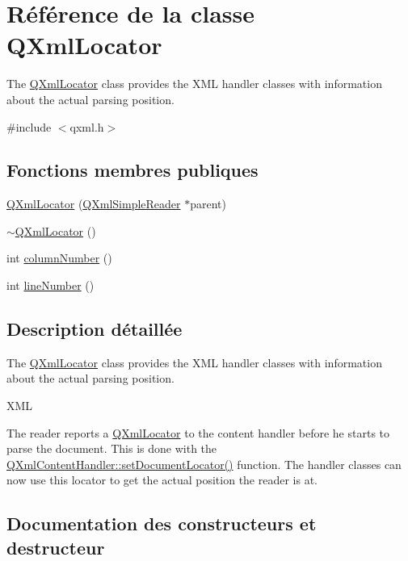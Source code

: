 \hypertarget{class_q_xml_locator}{}\section{Référence de la classe Q\+Xml\+Locator}
\label{class_q_xml_locator}


The \hyperlink{class_q_xml_locator}{Q\+Xml\+Locator} class provides the X\+M\+L handler classes with information about the actual parsing position.  




{\ttfamily \#include $<$qxml.\+h$>$}

\subsection*{Fonctions membres publiques}
\begin{DoxyCompactItemize}
\item 
\hyperlink{class_q_xml_locator_a0912b20182876aa1f1b1d2f8c39b69d6}{Q\+Xml\+Locator} (\hyperlink{class_q_xml_simple_reader}{Q\+Xml\+Simple\+Reader} $\ast$parent)
\item 
\hyperlink{class_q_xml_locator_a5c25ab17eea78be183aab4ff21ce3c17}{$\sim$\+Q\+Xml\+Locator} ()
\item 
int \hyperlink{class_q_xml_locator_a5f4b33431fe65b3fb4fa4f822aa384f4}{column\+Number} ()
\item 
int \hyperlink{class_q_xml_locator_ac595643330832dfa1222eac90ebc5fe7}{line\+Number} ()
\end{DoxyCompactItemize}


\subsection{Description détaillée}
The \hyperlink{class_q_xml_locator}{Q\+Xml\+Locator} class provides the X\+M\+L handler classes with information about the actual parsing position. 

X\+M\+L

The reader reports a \hyperlink{class_q_xml_locator}{Q\+Xml\+Locator} to the content handler before he starts to parse the document. This is done with the \hyperlink{class_q_xml_content_handler_a89863bd9a6372d3d73086aa99107bca7}{Q\+Xml\+Content\+Handler\+::set\+Document\+Locator()} function. The handler classes can now use this locator to get the actual position the reader is at. 

\subsection{Documentation des constructeurs et destructeur}
\hypertarget{class_q_xml_locator_a0912b20182876aa1f1b1d2f8c39b69d6}{}
